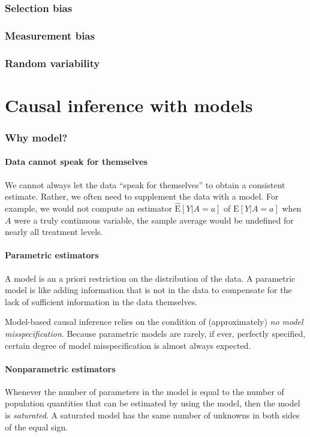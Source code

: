 \documentclass{article}
\begin{document}
\section{Selection bias}

\section{Measurement bias}

\section{Random variability}

\part*{Causal inference with models}
\section{Why model?}
\subsection{Data cannot speak for themselves}
We cannot always let the data “speak for themselves” to obtain a consistent estimate. Rather, we often need to supplement the data with a model. For example, we would not compute an estimator $\widehat{\mathrm{E}}[Y | A=a]$ of $\mathrm{E}[Y | A=a]$ when $A$ were a truly continuous variable, the sample average would be undefined for nearly all treatment levels.

\subsection{Parametric estimators}
A model is an a priori restriction on the distribution of the data. A parametric model is like adding information that is not in the data to compensate for the lack of sufficient information in the data themselves. 

Model-based causal inference relies on the condition of (approximately) \textit{no model misspecification}. Because parametric models are rarely, if ever, perfectly specified, certain degree of model misspecification is almost always expected.

\subsection{Nonparametric estimators}
Whenever the number of parameters in the model is equal to the number of population quantities that can be estimated by using the model, then the model is \textit{saturated}. A saturated model has the same number of unknowns in both sides of the equal sign. 
\end{document}
